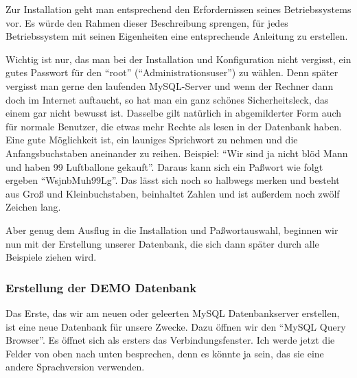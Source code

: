 Zur Installation geht man entsprechend den Erfordernissen seines Betriebssystems vor. Es würde den Rahmen dieser Beschreibung sprengen, für jedes Betriebssystem mit seinen Eigenheiten eine entsprechende Anleitung zu erstellen.

Wichtig ist nur, das man bei der Installation  und Konfiguration nicht vergisst, ein gutes Passwort für den "`root"' ("`Administrationsuser"') zu wählen. Denn später vergisst man gerne den laufenden MySQL-Server und wenn der Rechner dann doch im Internet auftaucht, so hat man ein ganz schönes Sicherheitsleck, das einem gar nicht bewusst ist. Dasselbe gilt natürlich in abgemilderter Form auch für normale Benutzer, die etwas mehr Rechte als lesen in der Datenbank haben. Eine gute Möglichkeit ist, ein launiges Sprichwort zu nehmen und die Anfangsbuchstaben aneinander zu reihen. Beispiel: "`Wir sind ja nicht blöd Mann und haben 99 Luftballone gekauft"'. Daraus kann sich ein Paßwort wie folgt ergeben "`WsjnbMuh99Lg"'. Das lässt sich noch so halbwegs merken und besteht aus Groß\- und Kleinbuchstaben, beinhaltet Zahlen und ist außerdem noch zwölf Zeichen lang. 

Aber genug dem Ausflug in die Installation und Paßwortauswahl, beginnen wir nun mit der Erstellung unserer Datenbank, die sich dann später durch alle Beispiele ziehen wird.

\subsubsection{Erstellung der DEMO Datenbank}
Das Erste, das wir am neuen oder geleerten MySQL Datenbankserver erstellen, ist eine neue Datenbank für unsere Zwecke. Dazu öffnen wir den "`MySQL Query Browser"'.
\label{fig:NewDB01}
Es öffnet sich als ersters das Verbindungsfenster. Ich werde jetzt die Felder von oben nach unten besprechen, denn es könnte ja sein, das sie eine andere Sprachversion verwenden. 

